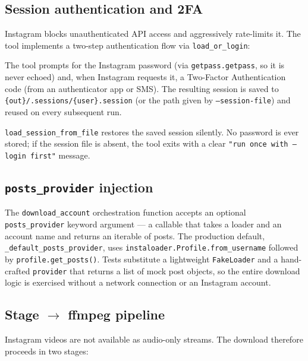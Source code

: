 \documentclass[11pt,a4paper]{report}
\newcommand{\code}[1]{\texttt{\small #1}}
\begin{document}
\subsection{Session authentication and 2FA}

Instagram blocks unauthenticated API access and aggressively rate-limits it.  The
tool implements a two-step authentication flow via \code{load\_or\_login}:

\begin{description}[leftmargin=2em,style=nextline]
  \item[First run — \code{--login}] The tool prompts for the Instagram password
        (via \code{getpass.getpass}, so it is never echoed) and, when Instagram
        requests it, a Two-Factor Authentication code (from an authenticator app
        or SMS).  The resulting session is saved to
        \code{\{out\}/.sessions/\{user\}.session} (or the path given by
        \code{--session-file}) and reused on every subsequent run.
  \item[Subsequent runs] \code{load\_session\_from\_file} restores the saved
        session silently.  No password is ever stored; if the session file is
        absent, the tool exits with a clear \code{"run once with --login first"}
        message.
\end{description}

\subsection{\texttt{posts\_provider} injection}

The \code{download\_account} orchestration function accepts an optional
\code{posts\_provider} keyword argument --- a callable that takes a loader and an
account name and returns an iterable of posts.  The production default,
\code{\_default\_posts\_provider}, uses \code{instaloader.Profile.from\_username}
followed by \code{profile.get\_posts()}.  Tests substitute a lightweight
\code{FakeLoader} and a hand-crafted \code{provider} that returns a list of mock
post objects, so the entire download logic is exercised without a network
connection or an Instagram account.

\subsection{Stage $\to$ ffmpeg pipeline}

Instagram videos are not available as audio-only streams.  The download therefore
proceeds in two stages:
\end{document}
